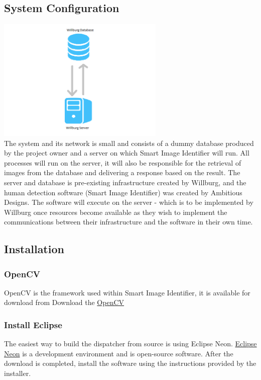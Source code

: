\documentclass[a4paper,12pt]{report}
\begin{document}
\subsection{System Configuration}
\includegraphics[width=8cm]{../Images/System.png}\\
 The system and its network is small and consists of a dummy database produced by the project owner and a server on which Smart Image Identifier will run. \linebreak
 All processes will run on the server, it will also be responsible for the retrieval of images from the database and delivering a response based on the result.
 \linebreak \linebreak
 The server and database is pre-existing infrastructure created by Willburg, and the human detection software (Smart Image Identifier) was created by Ambitious Designs. The software will execute on the server - which is to be implemented by Willburg once resources become available as they wish to implement the communications between their infrastructure and the software in their own time.
 
\subsection{Installation}
	\subsubsection{OpenCV}
	OpenCV is the framework used within Smart Image Identifier, it is available for download from 
	Download the
	\href{http://opencv.org/downloads.html}{OpenCV}
	\subsubsection{Install Eclipse}
	The easiest way to build the dispatcher from source is using Eclipse Neon. \href{https://www.eclipse.org/downloads/}{Eclipse Neon}
	 is a
	development environment and is open-source software. After the download is completed, install
	the software using the instructions provided by the installer.
	
\end{document}
